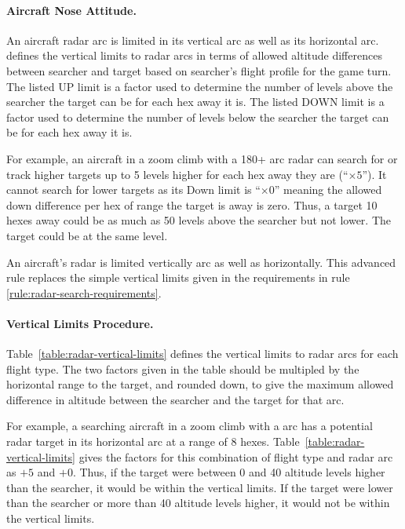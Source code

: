 \begin{advancedrules}
{\paragraph{Aircraft Nose Attitude.} An aircraft radar arc is limited in its vertical arc as well as its horizontal arc.  defines the vertical limits to radar arcs in terms of allowed altitude differences between searcher and target based on searcher's flight profile for the game turn. The listed UP limit is a factor used to determine the number of levels above the searcher the target can be for each hex away it is. The listed DOWN limit is a factor used to determine the number of levels below the searcher the target can be for each hex away it is. 

For example, an aircraft in a zoom climb with a 180+ arc radar can search for or track higher targets up to 5 levels higher for each hex away they are (“$\times5$”). It cannot search for lower targets as its Down limit is “$\times0$” meaning the allowed down difference per hex of range the target is away is zero. Thus, a target 10 hexes away could be as much as 50 levels above the searcher but not lower. The target could be at the same level.
}{
An aircraft's radar is limited vertically arc as well as horizontally. This advanced rule replaces the simple vertical limits given in the requirements in rule \ref{rule:radar-search-requirements}.

\paragraph{Vertical Limits Procedure.} Table~\ref{table:radar-vertical-limits} defines the vertical limits to radar arcs for each flight type. The two factors given in the table should be multipled by the horizontal range to the target, and rounded down, to give the maximum allowed difference in altitude between the searcher and the target for that arc.

For example, a searching aircraft in a zoom climb with a  arc has a potential radar target in its horizontal arc at a range of 8 hexes. Table~\ref{table:radar-vertical-limits} gives the factors for this combination of flight type and radar arc as $+5$ and $+0$. Thus, if the target were between 0 and 40 altitude levels higher than the searcher, it would be within the vertical limits. If the target were lower than the searcher or more than 40 altitude levels higher, it would not be within the vertical limits.
}


\end{advancedrules}
